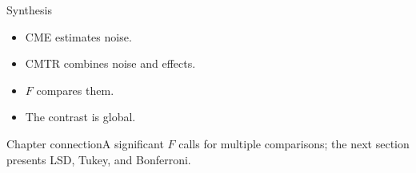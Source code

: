 \documentclass[10pt,aspectratio=169]{beamer}
\begin{document}
\begin{frame}{Synthesis}\small\begin{itemize}\item CME estimates noise.\item CMTR combines noise and effects.\item $F$ compares them.\item The contrast is global.\end{itemize}\end{frame}
\begin{frame}{Chapter connection}\small A significant $F$ calls for multiple comparisons; the next section presents LSD, Tukey, and Bonferroni.\end{frame}
\end{document}
